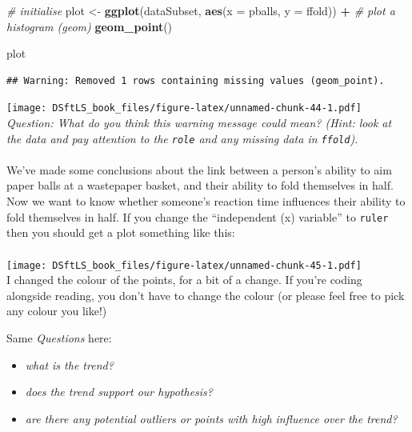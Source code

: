 \documentclass[
]{book}
\newenvironment{Shaded}{\begin{snugshade}}{\end{snugshade}}
\newcommand{\CommentTok}[1]{\textcolor[rgb]{0.56,0.35,0.01}{\textit{#1}}}
\newcommand{\DataTypeTok}[1]{\textcolor[rgb]{0.13,0.29,0.53}{#1}}
\newcommand{\KeywordTok}[1]{\textcolor[rgb]{0.13,0.29,0.53}{\textbf{#1}}}
\newcommand{\NormalTok}[1]{#1}
\newcommand{\OperatorTok}[1]{\textcolor[rgb]{0.81,0.36,0.00}{\textbf{#1}}}
\newcommand{\StringTok}[1]{\textcolor[rgb]{0.31,0.60,0.02}{#1}}
\providecommand{\tightlist}{%
  \setlength{\itemsep}{0pt}\setlength{\parskip}{0pt}}
\begin{document}
\begin{Shaded}
\begin{Highlighting}[]
\CommentTok{# initialise}
\NormalTok{plot <-}\StringTok{ }\KeywordTok{ggplot}\NormalTok{(dataSubset, }\KeywordTok{aes}\NormalTok{(}\DataTypeTok{x =}\NormalTok{ pballs, }\DataTypeTok{y =}\NormalTok{ ffold)) }\OperatorTok{+}
\StringTok{    }\CommentTok{# plot a histogram (geom)}
\StringTok{    }\KeywordTok{geom_point}\NormalTok{()}

\NormalTok{plot}
\end{Highlighting}
\end{Shaded}

\begin{verbatim}
## Warning: Removed 1 rows containing missing values (geom_point).
\end{verbatim}

\texttt{[image: DSftLS\_book\_files/figure-latex/unnamed-chunk-44-1.pdf]}\\

\emph{Question: What do you think this warning message could mean? (Hint: look
at the data and pay attention to the \texttt{role} and any missing data in \texttt{ffold}).}\\
~\\

We've made some conclusions about the link between a person's ability to
aim paper balls at a wastepaper basket, and their ability to fold themselves in half.
Now we want to know whether someone's reaction time influences their ability
to fold themselves in half. If you change the ``independent (x) variable'' to
\texttt{ruler} then you should get a plot something like this:\\
~\\
\texttt{[image: DSftLS\_book\_files/figure-latex/unnamed-chunk-45-1.pdf]}\\

I changed the colour of the points, for a bit of a change. If you're coding
alongside reading, you don't have to change the colour
(or please feel free to pick any colour you like!)

Same \emph{Questions} here:

\begin{itemize}
\tightlist
\item
  \emph{what is the trend?}
\item
  \emph{does the trend support our hypothesis?}
\item
  \emph{are there any potential outliers or points with high influence over the trend?}\\
  ~\\
\end{itemize}
\end{document}
